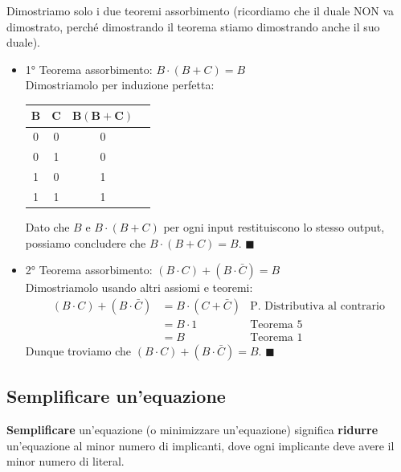 \documentclass[11pt, a4paper, titlepage, oneside]{scrbook}
\begin{document}
\Dimostrazione \nopagebreak

Dimostriamo solo i due teoremi assorbimento (ricordiamo che il duale NON va dimostrato, perché dimostrando il teorema stiamo dimostrando anche il suo duale).

\begin{itemize}
    \item 1° Teorema assorbimento: $B \cdot (B + C) = B$ \\
    Dimostriamolo per induzione perfetta:
    \begin{center}
    \begin{tabular}{cc|cc}
    $\bm{B}$ & $\bm{C}$ & $\bm{B(B+C)}$ \\
    \hline
    0 & 0 & 0 \\
    0 & 1 & 0 \\
    1 & 0 & 1 \\
    1 & 1 & 1 \\
    \end{tabular}
    \end{center}
    Dato che $B$ e $B \cdot (B + C)$ per ogni input restituiscono lo stesso output, possiamo concludere che $B \cdot (B + C) = B$. $\blacksquare$ 
    \item 2° Teorema assorbimento: $(B \cdot C) + (B \cdot \bar{C}) = B$ \\
    Dimostriamolo usando altri assiomi e teoremi:
    \begin{align*}
    (B \cdot C) + (B \cdot \bar{C}) &=  B \cdot (C + \bar{C}) &\text{P. Distributiva al contrario}\\
     &= B \cdot 1 &\text{Teorema 5} \\
     &= B &\text{Teorema 1} 
    \end{align*}
    Dunque troviamo che $(B \cdot C) + (B \cdot \bar{C}) = B$. $\blacksquare$
\end{itemize}

\subsection{Semplificare un'equazione}

\begin{Definizione}
\label{def-semplificare-equazione}
\textbf{Semplificare} un'equazione (o minimizzare un'equazione) significa \textbf{ridurre} un'equazione al minor numero di implicanti, dove ogni implicante deve avere il minor numero di literal.
\end{Definizione}
\end{document}
